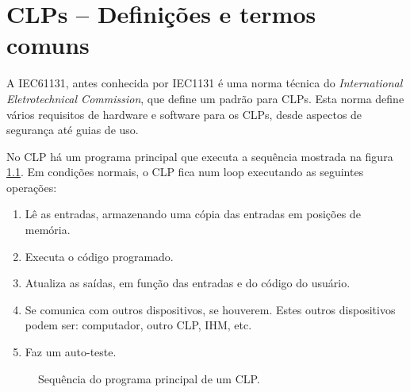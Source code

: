 \chapter{CLPs -- Definições e termos comuns}

A IEC61131, antes conhecida por IEC1131 é uma norma técnica do \emph{International Eletrotechnical Commission}, que define um padrão para CLPs. Esta norma define vários requisitos de hardware e software para os CLPs, desde aspectos de segurança até guias de uso.

No CLP há um programa principal que executa a sequência mostrada na figura \ref{fig:seq_clp}. Em condições normais, o CLP fica num loop executando as seguintes operações:
\begin{enumerate}
  \item Lê as entradas, armazenando uma cópia das entradas em posições de memória.
  \item Executa o código programado.
  \item Atualiza as saídas, em função das entradas e do código do usuário.
  \item Se comunica com outros dispositivos, se houverem. Estes outros dispositivos podem ser: computador, outro CLP, IHM, etc.
  \item Faz um auto-teste.
\end{enumerate}

\begin{figure}[!h]
  \centering
  \caption{Sequência do programa principal de um CLP.\label{fig:seq_clp}}
\end{figure}

